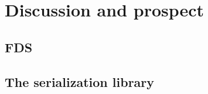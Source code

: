 
\clearpage
\section{Discussion and prospect}

\subsection{FDS}

\subsection{The serialization library}
